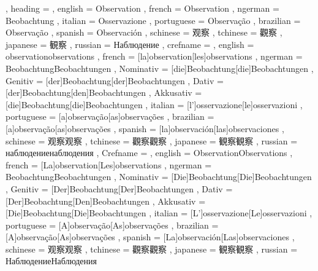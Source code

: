   {
    , heading =   {
                    , english     = Observation
                    , french      = Observation
                    , ngerman     = Beobachtung
                    , italian     = Osservazione
                    , portuguese  = Observação
                    , brazilian   = Observação
                    , spanish     = Observación
                    , schinese    = 观察
                    , tchinese    = 觀察
                    , japanese    = 観察
                    , russian     = Наблюдение
                  }
    , crefname =  {
                    , english     = {observation}{observations}
                    , french      = [la]{observation}[les]{observations}
                    , ngerman     = { {Beobachtung}{Beobachtungen}
                                      , Nominativ = [die]{Beobachtung}[die]{Beobachtungen}
                                      , Genitiv   = [der]{Beobachtung}[der]{Beobachtungen}
                                      , Dativ     = [der]{Beobachtung}[den]{Beobachtungen}
                                      , Akkusativ = [die]{Beobachtung}[die]{Beobachtungen}
                                    }
                    , italian     = [l']{osservazione}[le]{osservazioni}
                    , portuguese  = [a]{observação}[as]{observações}
                    , brazilian   = [a]{observação}[as]{observações}
                    , spanish     = [la]{observación}[las]{observaciones}
                    , schinese    = {观察}{观察}
                    , tchinese    = {觀察}{觀察}
                    , japanese    = {観察}{観察}
                    , russian     = {наблюдение}{наблюдения}
                  }
    , Crefname =  {
                    , english     = {Observation}{Observations}
                    , french      = [La]{observation}[Les]{observations}
                    , ngerman     = { {Beobachtung}{Beobachtungen}
                                      , Nominativ = [Die]{Beobachtung}[Die]{Beobachtungen}
                                      , Genitiv   = [Der]{Beobachtung}[Der]{Beobachtungen}
                                      , Dativ     = [Der]{Beobachtung}[Den]{Beobachtungen}
                                      , Akkusativ = [Die]{Beobachtung}[Die]{Beobachtungen}
                                    }
                    , italian     = [L']{osservazione}[Le]{osservazioni}
                    , portuguese  = [A]{observação}[As]{observações}
                    , brazilian   = [A]{observação}[As]{observações}
                    , spanish     = [La]{observación}[Las]{observaciones}
                    , schinese    = {观察}{观察}
                    , tchinese    = {觀察}{觀察}
                    , japanese    = {観察}{観察}
                    , russian     = {Наблюдение}{Наблюдения}
                  }
  }

